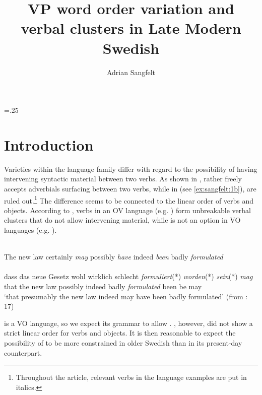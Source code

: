 \documentclass[output=paper, colorlinks, citecolor=brown]{langscibook}
\author{Adrian Sangfelt\affiliation{Uppsala University}}
\title{VP word order variation and verbal clusters in Late Modern Swedish}
\begin{document}
\multicolsep=.25\baselineskip
\maketitle 


\section{Introduction}\label{sec:sangfelt:1}

Varieties within the  language family differ with regard to the possibility of having intervening syntactic material between two verbs. As shown in ,  rather freely accepts adverbials surfacing between two verbs, while in  (see \ref{ex:sangfelt:1b}),  are ruled out.\footnote{Throughout the article, relevant verbs in the language examples are put in italics.} The difference seems to be connected to the linear order of verbs and objects. According to \citet[17–19, 33–35, 287–293]{Haider2010}, verbs in an OV language (e.g. ) form unbreakable verbal clusters that do not allow intervening material, while  is not an option in VO languages (e.g. ).

\ea
\label{ex:sangfelt:1}
\ea {}\label{ex:sangfelt:1a}\\
The new law {certainly} \textit{may} {possibly} \textit{have} {indeed} \textit{been} {badly} \textit{formulated} \\
\ex {}\label{ex:sangfelt:1b}\\
\gll dass das neue Gesetz {wohl} {wirklich} {schlecht} \textit{formuliert}(*) \textit{worden}(*) \textit{sein}(*) \textit{mag} \\
that the new law possibly indeed badly \textit{formulated} been be may \\
\glt ‘that presumably the new law indeed may have been badly formulated’ (from \citealt{Haider2010}: 17)
\z
\z 


 is a VO language, so we expect its grammar to allow . , however, did not show a strict linear order for verbs and objects. It is then reasonable to expect the possibility of  to be more constrained in older Swedish than in its present-day counterpart.
\end{document}
